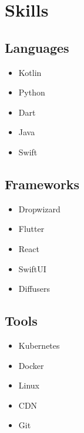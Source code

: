 \documentclass[12pt]{article}
\begin{document}
    \section{Skills}
    {
        \subsection{Languages}
        {
            \begin{multicols}{5}
                \begin{itemize}[nosep, parsep=0.1ex, itemsep=0.1ex]
                    \item Kotlin
                    \item Python
                    \item Dart
                    \item Java
                    \item Swift
                \end{itemize}
            \end{multicols}
        }
        \subsection{Frameworks}
        {
            \begin{multicols}{5}
                \begin{itemize}[nosep, parsep=0.1ex, itemsep=0.1ex]
                    \item Dropwizard
                    \item Flutter
                    \item React
                    \item SwiftUI
                    \item Diffusers
                \end{itemize}
            \end{multicols}
        }
        \subsection{Tools}
        {
            \begin{multicols}{5}
                \begin{itemize}[nosep, parsep=0.1ex, itemsep=0.1ex]
                    \item Kubernetes
                    \item Docker
                    \item Linux
                    \item CDN
                    \item Git
                \end{itemize}
            \end{multicols}
        }
    }
\end{document}
